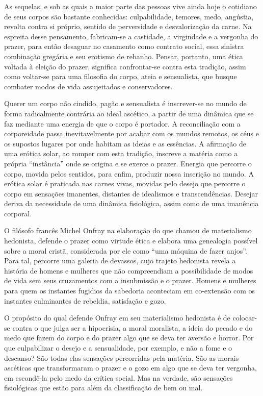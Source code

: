 As sequelas, e sob as quais a maior parte das pessoas vive ainda hoje o
cotidiano de seus corpos são bastante conhecidas: culpabilidade,
temores, medo, angústia, revolta contra si próprio, sentido de
perversidade e desvalorização da carne. Na espreita desse pensamento,
fabricam-se a castidade, a virgindade e a vergonha do prazer, para então
desaguar no casamento como contrato social, essa sinistra combinação
gregária e seu erotismo de rebanho. Pensar, portanto, uma ética voltada
à eleição do prazer, significa confrontar-se contra esta tradição, assim
como voltar-se para uma filosofia do corpo, ateia e sensualista, que
busque combater modos de vida assujeitados e conservadores.

Querer um corpo não cindido, pagão e sensualista é inscrever-se no mundo
de forma radicalmente contrária ao ideal ascético, a partir de uma
dinâmica que se faz mediante uma energia de que o corpo é portador. A
reconciliação com a corporeidade passa inevitavelmente por acabar com os
mundos remotos, os céus e os supostos lugares por onde habitam as ideias
e as essências. A afirmação de uma erótica solar, ao romper com esta
tradição, inscreve a matéria como a própria ``instância'' onde se
origina e se exerce o prazer. Energia que percorre o corpo, movida pelos
sentidos, para enfim, produzir nossa inscrição no mundo. A erótica solar
é praticada nas carnes vivas, movidas pelo desejo que percorre o corpo
em sensações imanentes, distantes de idealismos e transcendências.
Desejar deriva da necessidade de uma dinâmica fisiológica, assim como de
uma imanência corporal.

O filósofo francês Michel Onfray na elaboração do que chamou de
materialismo hedonista, defende o prazer como virtude ética e elabora
uma genealogia possível sobre a moral cristã, considerada por ele como
``uma máquina de fazer anjos''. Para tal, percorre uma galeria de
devassos, cujo trajeto hedonista revela a história de homens e mulheres
que não compreendiam a possibilidade de modos de vida sem seus
cruzamentos com a insubmissão e o prazer. Homens e mulheres para quem os
instantes fugidios da sabedoria aconteciam em co-extensão com os
instantes culminantes de rebeldia, satisfação e gozo.

O propósito do qual defende Onfray em seu materialismo hedonista é de
colocar-se contra o que julga ser a hipocrisia, a moral moralista, a
ideia do pecado e do medo que fazem do corpo e do prazer algo que se
deva ter aversão e horror. Por que culpabilizar o desejo e a
sensualidade, por exemplo, e não a fome e o descanso? São todas elas
sensações percorridas pela matéria. São as morais ascéticas que
transformaram o prazer e o gozo em algo que se deva ter vergonha, em
escondê-la pelo medo da crítica social. Mas na verdade, são sensações
fisiológicas que estão para além da classificação de bem ou mal.


